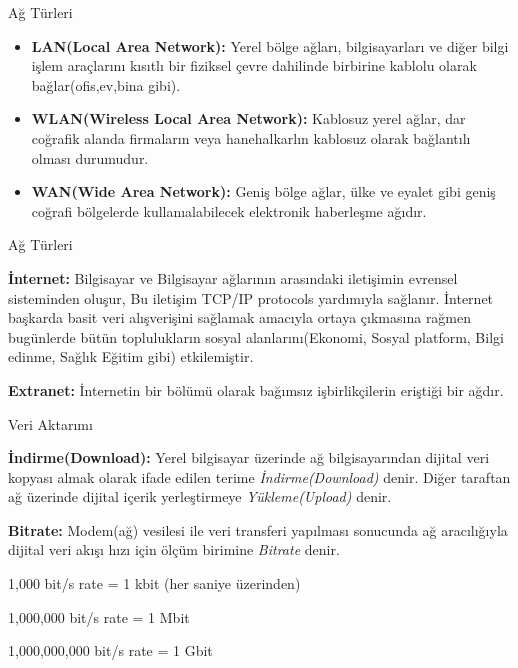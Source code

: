 \documentclass[
  12pt,
  ignorenonframetext,
]{beamer}
\begin{document}
\begin{frame}{Ağ Türleri}
\protect\hypertarget{aux11f-tuxfcrleri}{}

\begin{itemize}
\item
  \textbf{LAN(Local Area Network):} Yerel bölge ağları, bilgisayarları
  ve diğer bilgi işlem araçlarını kısıtlı bir fiziksel çevre dahilinde
  birbirine kablolu olarak bağlar(ofis,ev,bina gibi).
\item
  \textbf{WLAN(Wireless Local Area Network):} Kablosuz yerel ağlar, dar
  coğrafik alanda firmaların veya hanehalkarlın kablosuz olarak
  bağlantılı olması durumudur.
\item
  \textbf{WAN(Wide Area Network):} Geniş bölge ağlar, ülke ve eyalet
  gibi geniş coğrafi bölgelerde kullanıalabilecek elektronik haberleşme
  ağıdır.
\end{itemize}

\end{frame}

\begin{frame}{Ağ Türleri}
\protect\hypertarget{aux11f-tuxfcrleri-1}{}

\justify

\textbf{İnternet:} Bilgisayar ve Bilgisayar ağlarının arasındaki
iletişimin evrensel sisteminden oluşur, Bu iletişim TCP/IP protocols
yardımıyla sağlanır. İnternet başkarda basit veri alışverişini sağlamak
amacıyla ortaya çıkmasına rağmen bugünlerde bütün toplulukların sosyal
alanlarını(Ekonomi, Sosyal platform, Bilgi edinme, Sağlık Eğitim gibi)
etkilemiştir.

\textbf{Extranet:} İnternetin bir bölümü olarak bağımsız işbirlikçilerin
eriştiği bir ağdır.

\end{frame}

\begin{frame}{Veri Aktarımı}
\protect\hypertarget{veri-aktarux131mux131}{}

\justify

\textbf{İndirme(Download):} Yerel bilgisayar üzerinde ağ bilgisayarından
dijital veri kopyası almak olarak ifade edilen terime
\emph{İndirme(Download)} denir. Diğer taraftan ağ üzerinde dijital
içerik yerleştirmeye \emph{Yükleme(Upload)} denir.

\textbf{Bitrate:} Modem(ağ) vesilesi ile veri transferi yapılması
sonucunda ağ aracılığıyla dijital veri akışı hızı için ölçüm birimine
\emph{Bitrate} denir.

1,000 bit/s rate = 1 kbit (her saniye üzerinden)

1,000,000 bit/s rate = 1 Mbit

1,000,000,000 bit/s rate = 1 Gbit

\end{frame}
\end{document}
